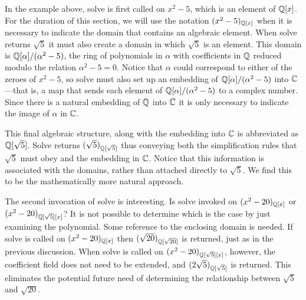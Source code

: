 In the example above, {\sf solve} is first called on $x^2-5$,
which is an element of ${\Bbb Q}[x]$.  For the duration of this section, we
will use the notation $(x^2-5)_{{\Bbb Q}[x]}$ when it is necessary to
indicate the domain that contains an algebraic element.  When {\sf
solve} returns $\sqrt{5}$ it must also create a domain in which
$\sqrt{5}$ is an element.  This domain is ${\Bbb Q}[\alpha]/(\alpha^2-5)$,
the ring of polynomials in $\alpha$ with coefficients in ${\Bbb Q}$ reduced
modulo the relation $\alpha^2-5=0$.  Notice that $\alpha$ could
correspond to either of the zeroes of $x^2-5$, so {\sf solve} must
also set up an embedding of ${\Bbb Q}[\alpha]/(\alpha^2-5)$ into ${\Bbb C}$---that
is, a map that sends each element of ${\Bbb Q}[\alpha]/(\alpha^2-5)$ to a
complex number.  Since there is a natural embedding of ${\Bbb Q}$ into ${\Bbb C}$
it is only necessary to indicate the image of $\alpha$ in ${\Bbb C}$.

This final algebraic structure, along with the embedding into ${\Bbb C}$ is
abbreviated as ${\Bbb Q}[\sqrt{5}]$.  {\sf Solve} returns
$(\sqrt{5})_{{\Bbb Q}[\sqrt{5}]}$ thus conveying both the simplification
rules that $\sqrt{5}$ must obey and the embedding in ${\Bbb C}$.  Notice
that this information is associated with the domains, rather than
attached directly to $\sqrt{5}$.  We find this to be the
mathematically more natural approach.

The second invocation of {\sf solve} is interesting.  Is {\sf solve}
invoked on $(x^2-20)_{{\Bbb Q}[x]}$ or $(x^2-20)_{{\Bbb Q}[\sqrt{5}][x]}$?  It is
not possible to determine which is the case by just examining the
polynomial.  Some reference to the enclosing domain is needed.
If {\sf solve} is called on $(x^2-20)_{{\Bbb Q}[x]}$ then
$(\sqrt{20})_{{\Bbb Q}[\sqrt{20}]}$ is returned, just as in the previous
discussion.  When {\sf solve} is called on
$(x^2-20)_{{\Bbb Q}[\sqrt{5}][x]}$, however, the coefficient field does not
need to be extended, and $(2\sqrt{5})_{{\Bbb Q}[\sqrt{5}]}$ is returned.
This eliminates the potential future need of determining the
relationship between $\sqrt{5}$ and $\sqrt{20}$.


